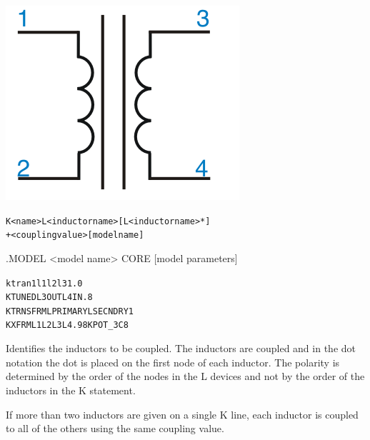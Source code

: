 



\begin{Device}\label{K_DEVICE}

\symbol
{\includegraphics{transformerSymbol}}

\device
\begin{alltt}
K<name> L<inductor name> [L<inductor name>*]
+ <coupling value> [model name]
\end{alltt}

\model
.MODEL <model name> CORE [model parameters]

\examples
\begin{alltt}
ktran1 l1 l2 l3 1.0
KTUNED L3OUT  L4IN .8
KTRNSFRM LPRIMARY LSECNDRY 1
KXFRM L1 L2  L3  L4 .98 KPOT\_3C8
\end{alltt}

\parameters
\begin{Parameters}


Identifies the inductors to be coupled. The inductors are coupled and in
the dot notation the dot is placed on the first node of each
inductor. The polarity is determined by the order of the nodes in the L
devices and not by the order of the inductors in the K statement.

If more than two inductors are given on a single K line, each inductor
is coupled to all of the others using the same coupling value.


\end{Parameters}
\end{Device}

